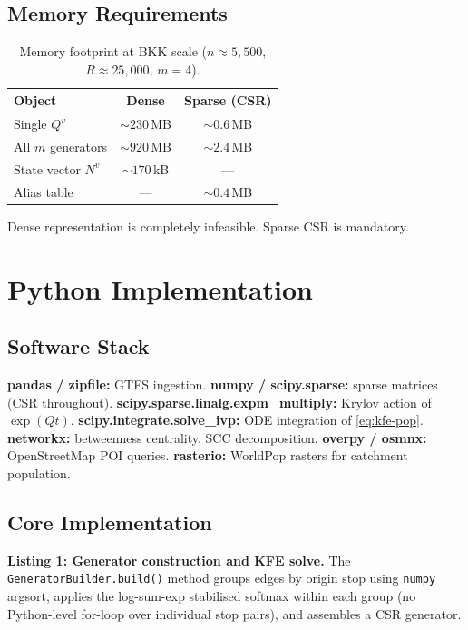 \documentclass[11pt,a4paper]{article}
\theoremstyle{plain}
\theoremstyle{definition}
\theoremstyle{remark}
\begin{document}
\subsection{Memory Requirements}

\begin{table}[h]
\centering
\caption{Memory footprint at BKK scale ($n\approx5{,}500$, $R\approx25{,}000$, $m=4$).}
\begin{tabular}{lcc}
\toprule
Object & Dense & Sparse (CSR) \\
\midrule
Single $Q^v$       & $\sim230$\,MB & $\sim0.6$\,MB \\
All $m$ generators & $\sim920$\,MB & $\sim2.4$\,MB \\
State vector $N^v$ & $\sim170$\,kB & --- \\
Alias table        & ---           & $\sim0.4$\,MB \\
\bottomrule
\end{tabular}
\end{table}

Dense representation is completely infeasible.  Sparse CSR is mandatory.

\section{Python Implementation}
\label{sec:impl}

\subsection{Software Stack}

\textbf{pandas / zipfile:} GTFS ingestion.\quad
\textbf{numpy / scipy.sparse:} sparse matrices (CSR throughout).\quad
\textbf{scipy.sparse.linalg.expm\_multiply:} Krylov action of $\exp(Qt)$.\quad
\textbf{scipy.integrate.solve\_ivp:} ODE integration of \eqref{eq:kfe-pop}.\quad
\textbf{networkx:} betweenness centrality, SCC decomposition.\quad
\textbf{overpy / osmnx:} OpenStreetMap POI queries.\quad
\textbf{rasterio:} WorldPop rasters for catchment population.

\subsection{Core Implementation}

\textbf{Listing 1: Generator construction and KFE solve.}
The \texttt{GeneratorBuilder.build()} method groups edges by origin stop using
\texttt{numpy} argsort, applies the log-sum-exp stabilised softmax within each
group (no Python-level for-loop over individual stop pairs), and assembles a
CSR generator.
\end{document}
